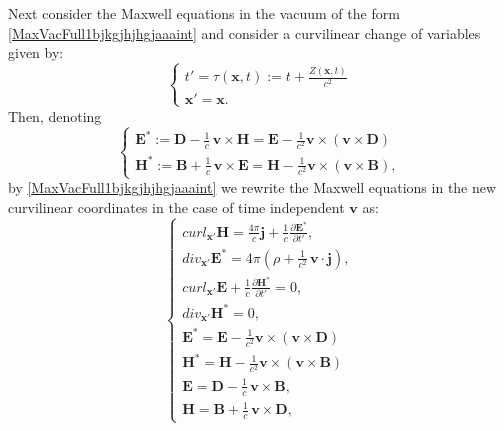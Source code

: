 \documentclass{article}
\theoremstyle{definition}
\theoremstyle{remark}
\renewcommand{\vec}[1]{\mathbf{#1}}
\newcommand{\R}{\mathbb{R}}
\newcommand{\er}{\eqref}
\newcommand{\R}{{\mathbb{R}}}
\newcommand{\er}{\eqref}
\begin{document}
Next consider the Maxwell equations in the vacuum of the form
\er{MaxVacFull1bjkgjhjhgjaaaint} and consider a curvilinear change
of variables given by:
\begin{equation}\label{giuuihjghgghjgj78zzrrZZffhhhggygghghjhvbKKint}
\begin{cases}
t'=\tau(\vec x,t):=t+\frac{Z(\vec x,t)}{c^2}\\
\vec x'=\vec x.
\end{cases}
\end{equation}
Then, denoting
\begin{equation}\label{giuuihjghgghjgj78zzrrZZffhhhggygghghjhvbgghhjyuuyKKint}
\begin{cases}
\vec E^*:=\vec D-\frac{1}{c}\,\vec v\times \vec H=\vec
E-\frac{1}{c^2}\vec v\times\left(\vec v\times\vec D\right)
\\
\vec H^*:=\vec B+\frac{1}{c}\,\vec v\times \vec E=\vec
H-\frac{1}{c^2}\vec v\times\left(\vec v\times\vec B\right),
\end{cases}
\end{equation}
by \er{MaxVacFull1bjkgjhjhgjaaaint} we rewrite the Maxwell equations
in the new curvilinear coordinates in the case of time independent
$\vec v$ as:
\begin{equation}\label{MaxMedFullGGffgguiuiouiogghghhgghhjhjhjjgghhgKKint}
\begin{cases}
curl_{\vec x'}\vec H= \frac{4\pi}{c}\vec j+
\frac{1}{c}\frac{\partial \vec E^*}{\partial
t'},\\
div_{\vec x'}\vec E^*= 4\pi\left(\rho+\frac{1}{c^2}\,\vec v\cdot\vec j\right),\\
curl_{\vec x'}\vec E+\frac{1}{c}\frac{\partial\vec H^*}{\partial
t'}=0,\\
div_{\vec x'}\vec H^*=0,\\
\vec E^*=\vec E-\frac{1}{c^2}\vec v\times\left(\vec v\times\vec
D\right)
\\
\vec H^*=\vec H-\frac{1}{c^2}\vec v\times\left(\vec v\times\vec
B\right)\\
\vec E=\vec D-\frac{1}{c}\,\vec v\times \vec B,\\
\vec H=\vec B+\frac{1}{c}\,\vec v\times \vec D,
\end{cases}
\end{equation}
\end{document}
